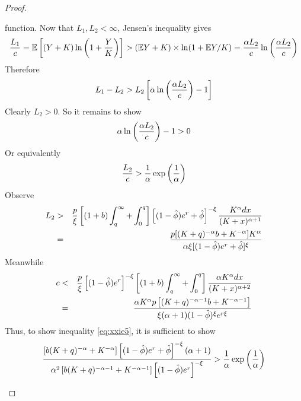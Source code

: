 \documentclass{article}
\newcommand{\E}{
  \mathbb{E}
}
\newcommand{\1}[1]{
  \mathbf{1}_{\{#1\}}
}
\begin{document}
\begin{proof}
\begin{enumerate}[i.]
    function. Now that $L_1, L_2 < \infty$, Jensen's inequality gives
    \[
    {L_1 \over c} = \E \left[
      (Y + K) \ln \left(1 + {Y \over K} \right)
    \right]
    >
    (\E Y + K) \times \ln(1 + \E Y/K)
    =
    {\alpha L_2  \over c}
    \ln\left(
      {\alpha L_2  \over c}
    \right)
    \]
    Therefore
    \[
    L_1 - L_2 > L_2 \left[
      \alpha \ln \left(
        {\alpha L_2 \over c}
      \right) - 1
    \right]
    \]
    Clearly $L_2 > 0$. So it remains to show
    \[
    \alpha \ln \left(
      {\alpha L_2 \over c}
    \right) - 1 > 0
    \]
    Or equivalently
    \begin{equation}
      \label{eq:xxie5}
      {L_2 \over c} > {1 \over \alpha} \exp\left( {1 \over \alpha} \right)
    \end{equation}
    Observe
    \begin{eqnarray*}
      L_2 &>&
      {p \over \xi}
      \left[
        (1 + b)\int_{q}^{\infty} +
        \int_{0}^q
      \right]
      \left[
        (1 - \hat\phi) e^r + \hat\phi
      \right]^{-\xi}
      {K^{\alpha} dx
        \over
        (K + x)^{\alpha + 1}
      } \\
      &=& {
        p [(K + q)^{-\alpha} b + K^{-\alpha}] K^\alpha
        \over
        \alpha \xi [(1 - \hat\phi) e^r + \hat\phi]^\xi
      } 
    \end{eqnarray*}
    Meanwhile
    \begin{eqnarray*}
      c &<& {p \over \xi}
      \left[
        (1 - \hat\phi) e^r
      \right]^{-\xi}
      \left[
        (1 + b)\int_{q}^{\infty} +
        \int_{0}^q
      \right]
      {
        \alpha K^{\alpha} dx \over (K + x)^{\alpha + 2}
      } \\
      &=&
      {
        \alpha K^\alpha p \left[ (K + q)^{-\alpha - 1} b + K^{-\alpha - 1} \right]
        \over
        \xi (\alpha + 1) (1 - \hat\phi)^\xi e^{r \xi}
      }
    \end{eqnarray*}
    Thus, to show inequality \eqref{eq:xxie5}, it is sufficient to show
    \begin{equation}
      \label{eq:xxie6}
      {
        \left[
          b (K + q)^{-\alpha} + K^{-\alpha}
        \right]
        \left[
          (1 - \hat\phi) e^r + \hat\phi
        \right]^{-\xi}
        (\alpha + 1)
        \over
        \alpha^2
        \left[
          b (K + q)^{-\alpha - 1} + K^{-\alpha - 1}
        \right]
        \left[
          (1 - \hat\phi) e^r
        \right]^{-\xi}
      } > {1 \over \alpha} \exp\left( {1 \over \alpha} \right)
    \end{equation}

\end{enumerate}
\end{proof}
\end{document}
